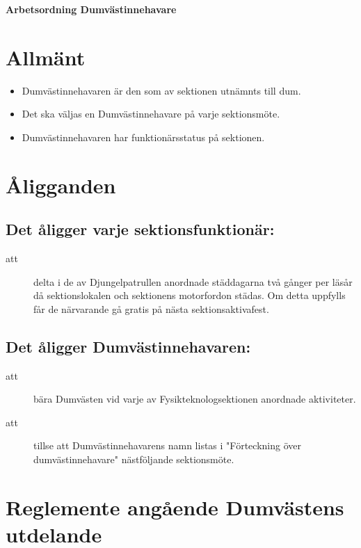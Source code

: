\renewcommand{\dateseparator}{-} %

\renewcommand{\forening}{Dumvästinnehavare}

\begin{center}
\LARGE{\textbf{Arbetsordning \forening}}
\end{center}


\section{Allmänt}
\begin{itemize}
\item Dumvästinnehavaren är den som av sektionen utnämnts till dum.
\item Det ska väljas en Dumvästinnehavare på varje sektionsmöte.
\item Dumvästinnehavaren har funktionärsstatus på sektionen.
\end{itemize}



\section{Åligganden}
\subsection{Det åligger varje sektionsfunktionär:}
    \begin{description}
      \item[att] delta i de av Djungelpatrullen anordnade städdagarna två gånger per
      läsår då sektionslokalen och sektionens motorfordon städas. Om detta uppfylls får de närvarande gå gratis på nästa
      sektionsaktivafest.
    \end{description}
\subsection{Det åligger Dumvästinnehavaren:}
    \begin{description}
      \item[att] bära Dumvästen vid varje av Fysikteknologsektionen anordnade aktiviteter.
      \item[att] tillse att Dumvästinnehavarens namn listas i "Förteckning över dumvästinnehavare" näst\-följ\-ande sektionsmöte.
    \end{description}

\section{Reglemente angående Dumvästens utdelande}

